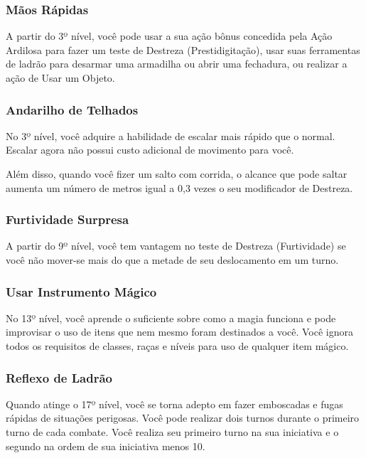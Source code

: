 \documentclass{RPG_Adventure}[2021/10/20]
\begin{document}
\subsubsection{Mãos Rápidas}%
\label{ssub:maos_rapidas}

A partir do 3º nível, você pode usar a sua ação bônus concedida pela Ação
Ardilosa para fazer um teste de Destreza (Prestidigitação), usar suas
ferramentas de ladrão para desarmar uma armadilha ou abrir uma fechadura, ou
realizar a ação de Usar um Objeto.

\subsubsection{Andarilho de Telhados}%
\label{ssub:andarilho_de_telhados}

No 3º nível, você adquire a habilidade de escalar mais rápido que o normal.
Escalar agora não possui custo adicional de movimento para você.

Além disso, quando você fizer um salto com corrida, o alcance que pode saltar
aumenta um número de metros igual a 0,3 vezes o seu modificador de Destreza.

\subsubsection{Furtividade Surpresa}%
\label{ssub:furtividade_surpresa}

A partir do 9º nível, você tem vantagem no teste de Destreza (Furtividade) se
você não mover-se mais do que a metade de seu deslocamento em um turno.

\subsubsection{Usar Instrumento Mágico}%
\label{ssub:usar_instrumento_magico}

 No 13º nível, você aprende o suficiente sobre como a magia funciona e pode
 improvisar o uso de itens que nem mesmo foram destinados a você. Você ignora
 todos os requisitos de classes, raças e níveis para uso de qualquer item
 mágico.

\subsubsection{Reflexo de Ladrão}%
\label{ssub:reflexo_de_ladrao}

Quando atinge o 17º nível, você se torna adepto em fazer emboscadas e fugas
rápidas de situações perigosas. Você pode realizar dois turnos durante o
primeiro turno de cada combate. Você realiza seu primeiro turno na sua
iniciativa e o segundo na ordem de sua iniciativa menos 10.
\end{document}
